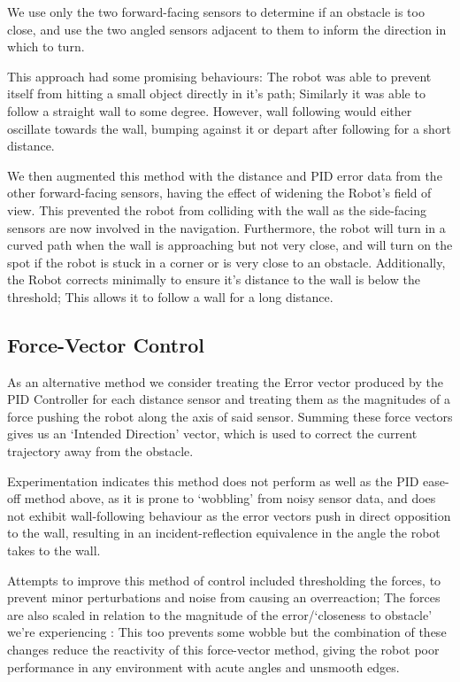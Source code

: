 \documentclass[11pt,a4wide]{article}
\begin{document}
We use only the two forward-facing sensors to determine if an obstacle is too close, 
and use the two angled sensors adjacent to them to inform the direction in which to 
turn.

This approach had some promising behaviours: The robot was able to prevent itself 
from hitting a small object directly in it's path; Similarly it was able to follow 
a straight wall to some degree. However, wall following would either oscillate 
towards the wall, bumping against it or depart after following for a short distance. 


We then augmented this method with the distance and PID error data from the other
forward-facing sensors, having the effect of widening the Robot's field of view.
This prevented the robot from colliding with the wall as the side-facing sensors 
are now involved in the navigation. Furthermore, the robot will turn in a curved path
when the wall is approaching but not very close, and will turn on the spot if the 
robot is stuck in a corner or is very close to an obstacle. Additionally, the Robot 
corrects minimally to ensure it's distance to the wall is below the threshold; This 
allows it to follow a wall for a long distance.

\subsection{Force-Vector Control}

As an alternative method we consider treating the Error vector produced by the
PID Controller for each distance sensor and treating them as the magnitudes of a 
force pushing the robot along the axis of said sensor. Summing these force vectors
gives us an `Intended Direction' vector, which is used to correct the current 
trajectory away from the obstacle.

Experimentation indicates this method does not perform as well as the PID ease-off 
method above, as it is prone to `wobbling' from noisy sensor data, and does not
exhibit wall-following behaviour as the error vectors push in direct opposition to 
the wall, resulting in an incident-reflection equivalence in the angle the robot
takes to the wall.

Attempts to improve this method of control included thresholding the forces, to 
prevent minor perturbations and noise from causing an overreaction; The forces are 
also scaled in relation to the magnitude of the error/`closeness to obstacle' we're 
experiencing : This too prevents some wobble but the combination of these changes 
reduce the reactivity of this force-vector method, giving the robot poor performance 
in any environment with acute angles and unsmooth edges.
\end{document}
